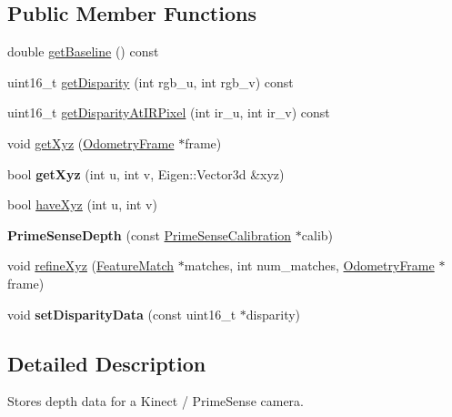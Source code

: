 \subsection*{Public Member Functions}
\begin{DoxyCompactItemize}
\item 
double \hyperlink{classfovis_1_1PrimeSenseDepth_a1941b0a011e836e922ce08cf48c635f9}{getBaseline} () const 
\item 
uint16\_\-t \hyperlink{classfovis_1_1PrimeSenseDepth_a2b700699b1150d1c3ce269eac01b897b}{getDisparity} (int rgb\_\-u, int rgb\_\-v) const 
\item 
uint16\_\-t \hyperlink{classfovis_1_1PrimeSenseDepth_a5e3469916e73c978f8ddabbbece456cf}{getDisparityAtIRPixel} (int ir\_\-u, int ir\_\-v) const 
\item 
void \hyperlink{classfovis_1_1PrimeSenseDepth_a9ba60dfd976745761bb861f08a374679}{getXyz} (\hyperlink{classfovis_1_1OdometryFrame}{OdometryFrame} $\ast$frame)
\item 
\hypertarget{classfovis_1_1PrimeSenseDepth_ae02d9ae398ad1009deb51c39ea4e7272}{
bool {\bfseries getXyz} (int u, int v, Eigen::Vector3d \&xyz)}
\label{classfovis_1_1PrimeSenseDepth_ae02d9ae398ad1009deb51c39ea4e7272}

\item 
bool \hyperlink{classfovis_1_1PrimeSenseDepth_af5915074d7b5e0694bcb0fae662c6c6c}{haveXyz} (int u, int v)
\item 
\hypertarget{classfovis_1_1PrimeSenseDepth_a31ff2c09c45447a349a0b628e15f66e9}{
{\bfseries PrimeSenseDepth} (const \hyperlink{classfovis_1_1PrimeSenseCalibration}{PrimeSenseCalibration} $\ast$calib)}
\label{classfovis_1_1PrimeSenseDepth_a31ff2c09c45447a349a0b628e15f66e9}

\item 
void \hyperlink{classfovis_1_1PrimeSenseDepth_a39e83560fd704306d53858d07d61621b}{refineXyz} (\hyperlink{classfovis_1_1FeatureMatch}{FeatureMatch} $\ast$matches, int num\_\-matches, \hyperlink{classfovis_1_1OdometryFrame}{OdometryFrame} $\ast$frame)
\item 
\hypertarget{classfovis_1_1PrimeSenseDepth_ac821e5da15e9dcb63fe49702d38c22ea}{
void {\bfseries setDisparityData} (const uint16\_\-t $\ast$disparity)}
\label{classfovis_1_1PrimeSenseDepth_ac821e5da15e9dcb63fe49702d38c22ea}

\end{DoxyCompactItemize}


\subsection{Detailed Description}
Stores depth data for a Kinect / PrimeSense camera. 

